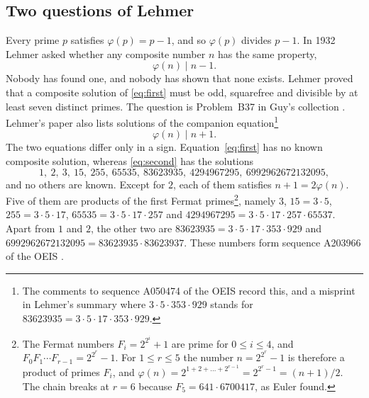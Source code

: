 \documentclass[11pt,reqno]{amsart}
\numberwithin{equation}{section}
\theoremstyle{plain}
\theoremstyle{definition}
\theoremstyle{remark}
\begin{document}
\subsection{Two questions of Lehmer}
Every prime $p$ satisfies $\varphi(p)=p-1$, and so $\varphi(p)$ divides
$p-1$. In 1932 Lehmer \cite{Leh32} asked whether any composite number
$n$ has the same property,
\begin{equation}\label{eq:first}
  \varphi(n)\mid n-1 .
\end{equation}
Nobody has found one, and nobody has shown that none exists. Lehmer
proved that a composite solution of \eqref{eq:first} must be odd,
squarefree and divisible by at least seven distinct primes. The
question is Problem~B37 in Guy's collection \cite{Guy04}. Lehmer's
paper also lists solutions of the companion equation\footnote{The
comments to sequence A050474 of the OEIS \cite{OEIS} record this, and
a misprint in Lehmer's summary where $3\cdot5\cdot353\cdot929$ stands
for $83623935=3\cdot5\cdot17\cdot353\cdot929$.}
\begin{equation}\label{eq:second}
  \varphi(n)\mid n+1 .
\end{equation}
The two equations differ only in a sign. Equation~\eqref{eq:first}
has no known composite solution, whereas \eqref{eq:second} has the
solutions
\begin{equation}\label{eq:known}
  1,\ 2,\ 3,\ 15,\ 255,\ 65535,\ 83623935,\ 4294967295,\
  6992962672132095,
\end{equation}
and no others are known. Except for $2$, each of them satisfies
$n+1=2\varphi(n)$. Five of them are products of the first Fermat
primes\footnote{The Fermat numbers $F_i=2^{2^i}+1$ are prime
for $0\le i\le4$, and $F_0F_1\cdots F_{r-1}=2^{2^r}-1$. For $1\le r\le5$
the number $n=2^{2^r}-1$ is therefore a product of primes $F_i$, and
$\varphi(n)=2^{1+2+\dots+2^{r-1}}=2^{2^r-1}=(n+1)/2$. The chain breaks
at $r=6$ because $F_5=641\cdot6700417$, as Euler found.}, namely $3$, $15=3\cdot5$,
$255=3\cdot5\cdot17$, $65535=3\cdot5\cdot17\cdot257$ and
$4294967295=3\cdot5\cdot17\cdot257\cdot65537$. Apart from $1$ and
$2$, the other two are
$83623935=3\cdot5\cdot17\cdot353\cdot929$ and
$6992962672132095=83623935\cdot83623937$. These numbers form sequence
A203966 of the OEIS \cite{OEIS}.
\end{document}
